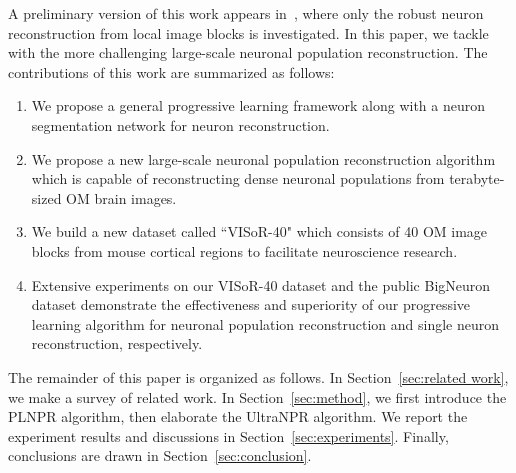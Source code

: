 A preliminary version of this work appears in~\cite{Zhao2019}, where only the robust neuron reconstruction from local image blocks is investigated. In this paper, we tackle with the more challenging large-scale neuronal population reconstruction.
The contributions of this work are summarized as follows:
\begin{enumerate}
\item We propose a general  progressive learning framework along with a neuron segmentation network for neuron reconstruction.
\item We propose a new large-scale neuronal population reconstruction algorithm which is capable of reconstructing dense neuronal populations from terabyte-sized OM brain images.
\item We build a new dataset called ``VISoR-40" which consists of 40 OM image blocks from mouse cortical regions to facilitate neuroscience research. %
\item Extensive experiments on our VISoR-40 dataset and the public BigNeuron dataset demonstrate the effectiveness and superiority of our progressive learning algorithm for neuronal population reconstruction and single neuron reconstruction, respectively.
\end{enumerate}

The remainder of this paper is organized as follows. In Section~\ref{sec:related work}, we make a survey of related work. In Section~\ref{sec:method}, we first introduce the PLNPR algorithm, then elaborate the UltraNPR algorithm. We report the experiment results and discussions in Section~\ref{sec:experiments}. Finally, conclusions are drawn in Section~\ref{sec:conclusion}.
